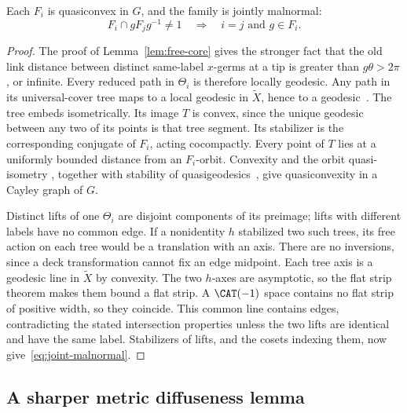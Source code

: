 \begin{lemma}\label{lem:line-geometry}
Each \(F_i\) is quasiconvex in \(G\), and the family is jointly
malnormal:
\begin{equation}\label{eq:joint-malnormal}
 F_i\cap gF_jg^{-1}\ne1\quad\Longrightarrow\quad i=j\text{ and }g\in F_i.
\end{equation}
\end{lemma}
\begin{proof}
The proof of Lemma~\ref{lem:free-core} gives the stronger fact that
the old link distance between distinct same-label \(x\)-germs at a
tip is greater than \(g\theta>2\pi\), or infinite. Every reduced
path in \(\Theta_i\) is therefore locally geodesic. Any path in its
universal-cover tree maps to a local geodesic in \(\widetilde X\),
hence to a geodesic~\cite[Proposition~II.1.4(2)]{BH}.
The tree embeds isometrically. Its image \(T\) is convex, since the
unique geodesic between any two of its points is that tree segment.
Its stabilizer is the corresponding conjugate of \(F_i\), acting
cocompactly. Every point of \(T\) lies at a uniformly bounded distance
from an \(F_i\)-orbit. Convexity and the orbit quasi-isometry
\cite[Proposition~I.8.19]{BH}, together with stability of
quasigeodesics~\cite[Theorem~III.H.1.7]{BH}, give quasiconvexity in a
Cayley graph of \(G\).

Distinct lifts of one \(\Theta_i\) are disjoint components of its
preimage; lifts with different labels have no common edge. If a
nonidentity \(h\) stabilized two such trees, its free action on each
tree would be a translation with an axis. There are no inversions,
since a deck transformation cannot fix an edge midpoint. Each tree
axis is a geodesic line in \(\widetilde X\) by convexity. The two
\(h\)-axes are asymptotic, so the flat strip theorem
\cite[Theorem~II.2.13]{BH} makes them bound a flat strip. A
\(\CAT(-1)\) space contains no flat strip of positive width, so they
coincide. This common line contains edges, contradicting the stated
intersection properties unless the two lifts are identical and have
the same label. Stabilizers of lifts, and the cosets indexing them,
now give~\eqref{eq:joint-malnormal}.
\end{proof}

\subsection{A sharper metric diffuseness lemma}

